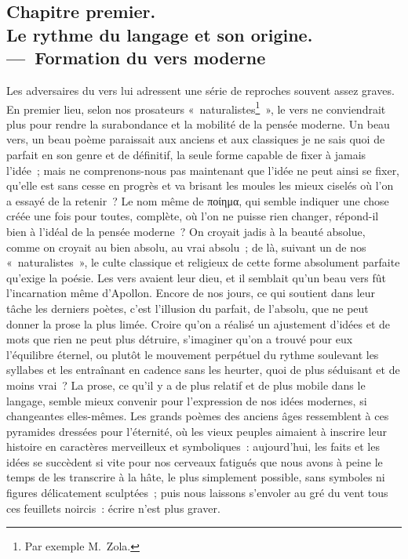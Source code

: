 \documentclass[french,twoside]{book} %
\begin{document}
\subsection[{Chapitre premier. Le rythme du langage et son origine. — Formation du vers moderne}]{Chapitre premier. \\
Le rythme du langage et son origine. — Formation du vers moderne}
\noindent  Les adversaires du vers lui adressent une série de reproches souvent assez graves. En premier lieu, selon nos prosateurs « naturalistes\footnote{Par exemple M. Zola.} », le vers ne conviendrait plus pour rendre la surabondance et la mobilité de la pensée moderne. Un beau vers, un beau poème paraissait aux anciens et aux classiques je ne sais quoi de parfait en son genre et de définitif, la seule forme capable de fixer à jamais l’idée ; mais ne comprenons-nous pas maintenant que l’idée ne peut ainsi se fixer, qu’elle est sans cesse en progrès et va brisant les moules les mieux ciselés où l’on a essayé de la retenir ? Le nom même de ποίημα, qui semble indiquer une chose créée une fois pour toutes, complète, où l’on ne puisse rien changer, répond-il bien à l’idéal de la pensée moderne ? On croyait jadis à la beauté absolue, comme on croyait au bien absolu, au vrai absolu ; de là, suivant un de nos « naturalistes », le culte classique et  religieux de cette forme absolument parfaite qu’exige la poésie. Les vers avaient leur dieu, et il semblait qu’un beau vers fût l’incarnation même d’Apollon. Encore de nos jours, ce qui soutient dans leur tâche les derniers poètes, c’est l’illusion du parfait, de l’absolu, que ne peut donner la prose la plus limée. Croire qu’on a réalisé un ajustement d’idées et de mots que rien ne peut plus détruire, s’imaginer qu’on a trouvé pour eux l’équilibre éternel, ou plutôt le mouvement perpétuel du rythme soulevant les syllabes et les entraînant en cadence sans les heurter, quoi de plus séduisant et de moins vrai ? La prose, ce qu’il y a de plus relatif et de plus mobile dans le langage, semble mieux convenir pour l’expression de nos idées modernes, si changeantes elles-mêmes. Les grands poèmes des anciens âges ressemblent à ces pyramides dressées pour l’éternité, où les vieux peuples aimaient à inscrire leur histoire en caractères merveilleux et symboliques : aujourd’hui, les faits et les idées se succèdent si vite pour nos cerveaux fatigués que nous avons à peine le temps de les transcrire à la hâte, le plus simplement possible, sans symboles ni figures délicatement sculptées ; puis nous laissons s’envoler au gré du vent tous ces feuillets noircis : écrire n’est plus graver.\par
\end{document}
